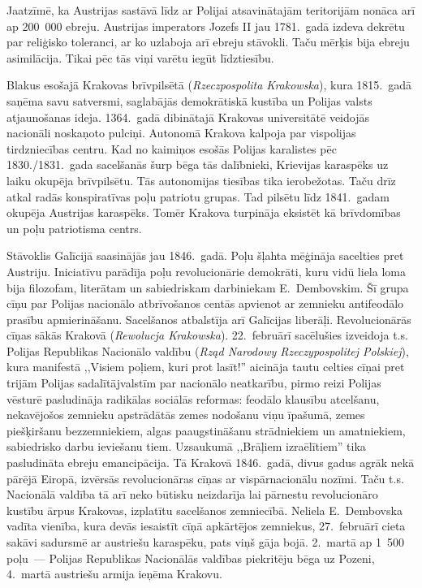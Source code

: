 \documentclass[twoside,a5paper,12pt,fleqn,openany]{extbook}
\newcommand{\pltxti}[1]{\textit{\textpolish{#1}}}
\begin{document}
Jaatzīmē, ka Austrijas sastāvā līdz ar Polijai atsavinātajām teritorijām nonāca arī ap 200~000 ebreju. Austrijas imperators Jozefs II jau 1781.~gadā izdeva dekrētu par reliģisko toleranci, ar ko uzlaboja arī ebreju stāvokli. Taču mērķis bija ebreju asimilācija. Tikai pēc tās viņi varētu iegūt līdztiesību.

Blakus esošajā Krakovas brīvpilsētā (\pltxti{Rzeczpospolita Krakowska}), kura 1815.~gadā saņēma savu satversmi, saglabājās demokrātiskā kustība un Polijas valsts atjaunošanas ideja. 1364.~gadā dibinātajā Krakovas universitātē veidojās nacionāli noskaņoto pulciņi. Autonomā Krakova kalpoja par vispolijas tirdzniecības centru. Kad no kaimiņos esošās Polijas karalistes pēc 1830./1831.~gada sacelšanās šurp bēga tās dalībnieki, Krievijas karaspēks uz laiku okupēja brīvpilsētu. Tās autonomijas tiesības tika ierobežotas. Taču drīz atkal radās konspiratīvas poļu patriotu grupas. Tad pilsētu līdz 1841.~gadam okupēja Austrijas karaspēks. Tomēr Krakova turpināja eksistēt kā brīvdomības un poļu patriotisma centrs.

Stāvoklis Galīcijā saasinājās jau 1846.~gadā. Poļu šļahta mēģināja sacelties pret Austriju. Iniciatīvu parādīja poļu revolucionārie demokrāti, kuru vidū liela loma bija filozofam, literātam un sabiedriskam darbiniekam E.~Dembovskim. Šī grupa cīņu par Polijas nacionālo atbrīvošanos centās apvienot ar zemnieku antifeodālo prasību apmierināšanu. Sacelšanos atbalstīja arī Galīcijas liberāļi. Revolucionārās cīņas sākās Krakovā (\pltxti{Rewolucja Krakowska}). 22.~februārī sacēlušies izveidoja t.s. Polijas Republikas Nacionālo valdību (\pltxti{Rząd Narodowy Rzeczypospolitej Polskiej}), kura manifestā ,,Visiem poļiem, kuri prot lasīt!'' aicināja tautu celties cīņai pret trijām Polijas sadalītājvalstīm par nacionālo neatkarību, pirmo reizi Polijas vēsturē pasludināja radikālas sociālās reformas: feodālo klausību atcelšanu, nekavējošos zemnieku apstrādātās zemes nodošanu viņu īpašumā, zemes piešķiršanu bezzemniekiem, algas paaugstināšanu strādniekiem un amatniekiem, sabiedrisko darbu ieviešanu tiem. Uzsaukumā ,,Brāļiem izraēlītiem'' tika pasludināta ebreju emancipācija. Tā Krakovā 1846.~gadā, divus gadus agrāk nekā pārējā Eiropā, izvērsās revolucionāras cīņas ar vispārnacionālu nozīmi. Taču t.s. Nacionālā valdība tā arī neko būtisku neizdarīja lai pārnestu revolucionāro kustību ārpus Krakovas, izplatītu sacelšanos zemniecībā. Neliela E.~Dembovska vadīta vienība, kura devās iesaistīt cīņā apkārtējos zemniekus, 27.~februārī cieta sakāvi sadursmē ar austriešu karaspēku, pats viņš gāja bojā. 2.~martā ap 1~500 poļu~--- Polijas Republikas Nacionālās valdības piekritēju bēga uz Pozeni, 4.~martā austriešu armija ieņēma Krakovu.
\end{document}
